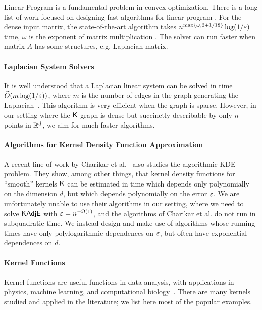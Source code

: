 Linear Program is a fundamental problem in convex optimization. There is a long list of work focused on designing fast algorithms for linear program \cite{d47,k80,k84,v87,v89_lp,ls14,ls15,cls19,lsz19,song19,b20,blss20,sy20,jswz20}. For the dense input matrix, the state-of-the-art algorithm \cite{jswz20} takes $n^{\max\{\omega,2+1/18\}} \log (1/\varepsilon)$ time, $\omega$ is the exponent of matrix multiplication \cite{aw21}. The solver can run faster when matrix $A$ has some structures, e.g. Laplacian matrix. 

\paragraph*{Laplacian System Solvers}
It is well understood that a Laplacian linear system can be solved in time $\widetilde{O} (m \log ( 1 / \varepsilon ) )$, where $m$ is the number of edges in the graph generating the Laplacian~\cite{st04,kmp10,kmp11,kosz13,ls13,ckmpprx14,klpss16,ks16}. This algorithm is very efficient when the graph is sparse. However, in our setting where the $\mathsf{K}$ graph is dense but succinctly describable by only $n$ points in ${\mathbb R}^d$, we aim for much faster algorithms. 

\paragraph*{Algorithms for Kernel Density Function Approximation} A recent line of work by Charikar et al.~\cite{cs17,bcis18} also studies the algorithmic KDE problem. They show, among other things, that kernel density functions for ``smooth'' kernels $\mathsf{K}$ can be estimated in time which depends only polynomially on the dimension $d$, but which depends polynomially on the error $\varepsilon$. We are unfortunately unable to use their algorithms in our setting, where we need to solve $\mathsf{KAdjE}$ with $\varepsilon = n^{-\Omega(1)}$, and the algorithms of Charikar et al. do not run in subquadratic time. We instead design and make use of algorithms whose running times have only polylogarithmic dependences on $\varepsilon$, but often have exponential dependences on $d$.


\paragraph{Kernel Functions}
Kernel functions are useful functions in data analysis, with applications in physics, machine learning, and computational biology~\cite{s10}. There are many kernels studied and applied in the literature; we list here most of the popular examples.

